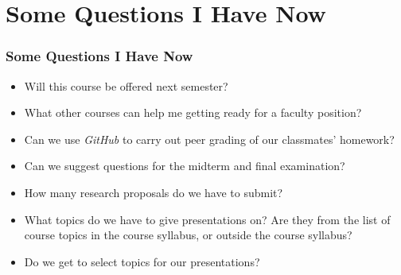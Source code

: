 \documentclass[xcolor={usenames,dvipsnames},hyperref={hyperindex,bookmarks}]{beamer}
\begin{document}
\section{Some Questions I Have Now}

\frame
{
	\frametitle{Some Questions I Have Now}

	\begin{itemize}
	\item Will this course be offered next semester?
	\item What other courses can help me getting ready for a faculty position?
	\item Can we use {\it GitHub} to carry out peer grading of our classmates' homework?
	\item Can we suggest questions for the midterm and final examination?
	\item How many research proposals do we have to submit?
	\item What topics do we have to give presentations on? Are they from the list of course topics in the course syllabus, or outside the course syllabus?
	\item Do we get to select topics for our presentations?
	\end{itemize}
}












%
%
%
%
%	
%	
\end{document}
